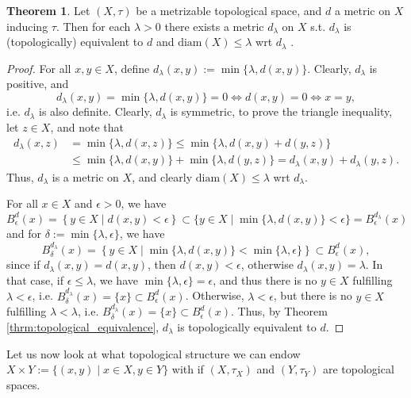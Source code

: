 \documentclass[12pt, a4paper]{article}
\numberwithin{equation}{section}
\theoremstyle{definition}
\theoremstyle{definition}
\newtheorem{theorem}[thm]{Theorem}
\begin{document}
		\begin{theorem}\label{thrm:equivalent_metric_finite_diameter}
			Let $(X, \tau)$ be a metrizable topological space, and $d$ a metric on $X$ inducing $\tau$. Then for each $\lambda > 0$ there exists a metric $d_{\lambda}$ on $X$ s.t. $d_{\lambda}$ is (topologically) equivalent to $d$ and $\text{diam}(X) \leq \lambda$ wrt $d_{\lambda}$ \cite{topology-singh}.
		\end{theorem}
	
		\begin{proof}
			For all $x, y\in X$, define $d_{\lambda}(x, y) := \min\{\lambda, d(x, y)\}$. Clearly, $d_{\lambda}$ is positive, and $$d_{\lambda}(x, y) = \min\{\lambda, d(x, y)\} = 0\Leftrightarrow d(x, y) = 0\Leftrightarrow x = y,$$ i.e. $d_{\lambda}$ is also definite.
			Clearly, $d_{\lambda}$ is symmetric, to prove the triangle inequality, let $z\in X$, and note that
			\begin{align*}
				d_{\lambda}(x, z) &= \min\{\lambda, d(x, z)\} \leq \min\{ \lambda, d(x, y) + d(y, z) \} \\ &\leq \min\{\lambda, d(x, y)\} + \min\{\lambda, d(y, z)\} = d_{\lambda}(x, y) + d_{\lambda}(y, z).
			\end{align*}
			Thus, $d_{\lambda}$ is a metric on $X$, and clearly $\text{diam}(X)\leq\lambda$ wrt $d_{\lambda}$. 
			
			For all $x\in X$ and $\epsilon > 0$, we have 
			$$B^{d}_{\epsilon}(x)  = \left\{y\in X\mid d(x, y) < \epsilon\right\} \subset \{y\in X\mid \min\{\lambda, d(x, y)\} < \epsilon\} = B_{\epsilon}^{d_{\lambda}}(x)$$
			and for $\delta := \min\{\lambda, \epsilon\}$, we have
			$$B^{d_{\lambda}}_{\delta}(x) = \left\{y\in X\mid \min\{\lambda, d(x, y)\} < \min\{\lambda, \epsilon\}\right\} \subset B^{d}_{\epsilon}(x),$$
			since if $d_{\lambda}(x, y) = d(x, y)$, then $d(x, y) < \epsilon$, otherwise $d_{\lambda}(x, y) = \lambda$. In that case, if $\epsilon\leq \lambda$, we have $\min\{\lambda, \epsilon\} = \epsilon$, and thus there is no $y\in X$ fulfilling $\lambda < \epsilon$, i.e. $B_{\delta}^{d_{\lambda}}(x) = \{x\}\subset B_{\epsilon}^{d}(x)$. Otherwise, $\lambda < \epsilon$, but there is no $y\in X$ fulfilling $\lambda < \lambda$, i.e. $B_{\delta}^{d_{\lambda}}(x) = \{x\}\subset B_{\epsilon}^{d}(x)$. Thus, by Theorem \ref{thrm:topological_equivalence}, $d_{\lambda}$ is topologically equivalent to $d$.
		\end{proof}
				
		Let us now look at what topological structure we can endow $X\times Y := \{ (x, y) \mid x\in X, y\in Y \}$ with if $(X, \tau_X)$ and $(Y, \tau_Y)$ are topological spaces.
		
\end{document}

